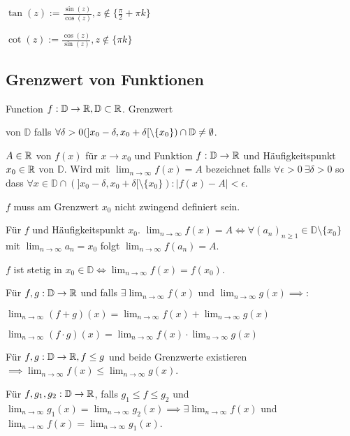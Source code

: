 \begin{compactdesc}
    \item[Tangens:] $\tan(z) := \frac{\sin(z)}{\cos(z)}, z \not\in \{\frac{\pi}{2} + \pi k\}$
    \item[Cotangens:] $\cot(z) := \frac{\cos(z)}{\sin(z)}, z \not\in \{\pi k\}$
\end{compactdesc}


\subsection{Grenzwert von Funktionen}
Function $f: \mathbb{D} \to \mathbb{R}, \mathbb{D} \subset \mathbb{R}$. Grenzwert 
\begin{compactdesc}
    \item[Häufigkeitspunkt:] von $\mathbb{D}$ falls $\forall \delta > 0 (]x_0 - \delta, x_0 + \delta[ \setminus \{x_0\} ) \cap \mathbb{D} \neq \emptyset$.
    \item[Grenzwert:] $A \in \mathbb{R}$ von $f(x)$ für $x \to x_0$ und Funktion $f:\mathbb{D} \to \mathbb{R}$ und Häufigkeitspunkt $x_0 \in \mathbb{R}$ von $\mathbb{D}$. Wird mit $\lim_{n \to \infty} f(x) = A$ bezeichnet falls $\forall \epsilon > 0 \ \exists \delta > 0$ so dass $\forall x \in \mathbb{D} \cap (]x_0 - \delta, x_0 + \delta[ \setminus \{x_0\}) : |f(x) - A| < \epsilon$.
\end{compactdesc}
\begin{compactitem}
    \item $f$ muss am Grenzwert $x_0$ nicht zwingend definiert sein.
    \item Für $f$ und Häufigkeitspunkt $x_0$. $\lim_{n \to \infty}f(x) = A \iff \forall (a_n)_{n \ge 1} \in \mathbb{D} \setminus \{x_0\}$ mit $\lim_{n \to \infty} a_n = x_0$ folgt $\lim_{n \to \infty}f(a_n) = A$.
    \item $f$ ist stetig in $x_0 \in \mathbb{D} \iff \lim_{n \to \infty} f(x) = f(x_0)$.
    \item Für $f,g: \mathbb{D} \to \mathbb{R}$ und falls $\exists \lim_{n \to \infty} f(x)$ und $\lim_{n \to \infty} g(x) \implies$:
        \begin{inparaitem}
            \item $\lim_{n \to \infty} (f + g)(x) = \lim_{n \to \infty} f(x) + \lim_{n \to \infty} g(x)$
            \item $\lim_{n \to \infty} (f \cdot g)(x) = \lim_{n \to \infty} f(x) \cdot \lim_{n \to \infty} g(x)$
        \end{inparaitem}
    \item Für $f,g: \mathbb{D} \to \mathbb{R}, f \le g$ und beide Grenzwerte existieren $\implies \lim_{n \to \infty} f(x) \le \lim_{n \to \infty} g(x)$.
    \item Für $f,g_1, g_2: \mathbb{D} \to \mathbb{R}$, falls $g_1 \le f \le g_2$ und $\lim_{n \to \infty} g_1(x) = \lim_{n \to \infty} g_2(x) \implies \exists \lim_{n \to \infty} f(x)$ und $\lim_{n \to \infty} f(x) = \lim_{n \to \infty} g_1(x)$.
\end{compactitem}

